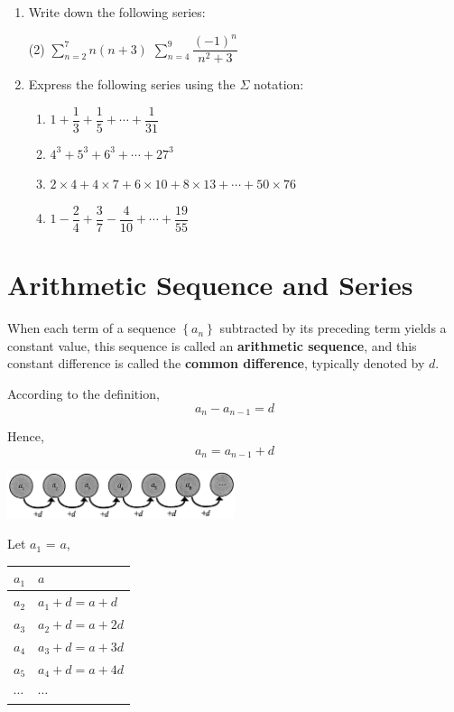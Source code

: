 \documentclass{report}
\begin{document}
\begin{enumerate}[label=\textbf{\arabic*.}]
    \item Write down the following series:
    \begin{tasks}[label=(\alph*)](2)
        \task \( \displaystyle\sum_{n=2}^{7} n(n+3) \)
        \task \( \displaystyle\sum_{n=4}^{9} \dfrac{(-1)^{n}}{n^{2}+3} \)
    \end{tasks}
    
    \item Express the following series using the \( \Sigma \) notation:
    \begin{enumerate}[label=(\alph*)]
        \item \( 1+\dfrac{1}{3}+\dfrac{1}{5}+\cdots+\dfrac{1}{31} \)
        \item \( 4^{3}+5^{3}+6^{3}+\cdots+27^{3} \)
        \item \( 2 \times 4+4 \times 7+6 \times 10+8 \times 13+\cdots+50 \times 76 \)
        \item \( 1-\dfrac{2}{4}+\dfrac{3}{7}-\dfrac{4}{10}+\cdots+\dfrac{19}{55} \)
    \end{enumerate}
\end{enumerate}

\newpage
\section{Arithmetic Sequence and Series}

When each term of a sequence \( \left\{a_{n}\right\} \) subtracted by its preceding term yields a constant value, this sequence is called an \textbf{arithmetic sequence}, and this constant difference is called the \textbf{common difference}, typically denoted by \( d \).

According to the definition,
$$a_n - a_{n-1} = d$$

Hence,
$$a_n = a_{n-1} + d$$

\begin{center}
    \includegraphics[width=0.5\textwidth]{assets/13-1.jpg}
\end{center}

Let $a_1$ = $a$,
\begin{center}
    \begin{tabular}{|l|l|}
        \hline$a_{1}$ & $a$ \\
        \hline $a_{2}$ & $a_{1}+d=a+d$ \\
        \hline$a_{3}$ & $a_{2}+d=a+2 d$ \\
        \hline$a_{4}$ & $a_{3}+d=a+3 d$ \\
        \hline$a_{5}$ & $a_{4}+d=a+4 d$ \\
        \hline$\cdots$ & $\cdots$ \\
        \hline
    \end{tabular}
\end{center}
\end{document}

